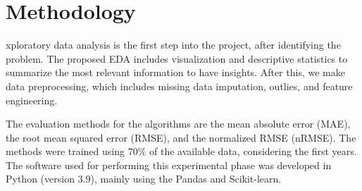 \section{Methodology}
\label{sec:methodology}

xploratory data analysis is the first step into the project, after
identifying the problem. The proposed EDA includes visualization and descriptive statistics to
summarize the most relevant information to have insights. After this, we make
data preprocessing, which includes missing data imputation, outlies, and
feature engineering.   

The evaluation methods for the algorithms are the mean absolute error (MAE), the root
mean squared error (RMSE), and the normalized RMSE (nRMSE). The methods were
trained using 70\% of the available data, considering the first years. The
software used for performing this experimental phase was developed in Python (version 3.9), mainly using the Pandas and Scikit-learn.
